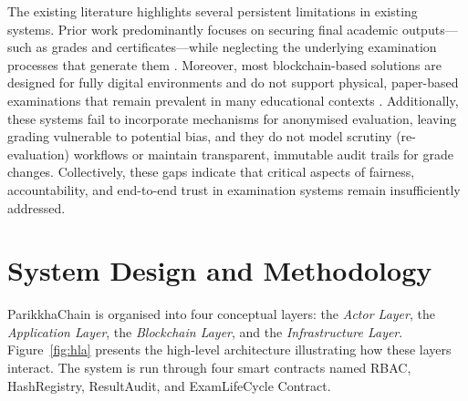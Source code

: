 \documentclass[conference]{IEEEtran}
\begin{document}
The existing literature highlights several persistent limitations in existing systems. Prior work predominantly focuses on securing final academic outputs—such as grades and certificates—while neglecting the underlying examination processes that generate them \cite{chinnasamy2025blockchain,hybrid2024maritime,pandey2023idms}. Moreover, most blockchain-based solutions are designed for fully digital environments and do not support physical, paper-based examinations that remain prevalent in many educational contexts \cite{sattar2023advanced,shirke2025trustexaminator}. Additionally, these systems fail to incorporate mechanisms for anonymised evaluation, leaving grading vulnerable to potential bias, and they do not model scrutiny (re-evaluation) workflows or maintain transparent, immutable audit trails for grade changes. Collectively, these gaps indicate that critical aspects of fairness, accountability, and end-to-end trust in examination systems remain insufficiently addressed.
 

 



\section{System Design and Methodology}
\label{sec:design}

ParikkhaChain is organised into four conceptual layers: the \emph{Actor
Layer}, the \emph{Application Layer}, the \emph{Blockchain Layer}, and the
\emph{Infrastructure Layer}. Figure~\ref{fig:hla} presents the high-level
architecture illustrating how these layers interact. The system is run through four smart contracts named RBAC, HashRegistry, ResultAudit, and ExamLifeCycle Contract. 
\end{document}
